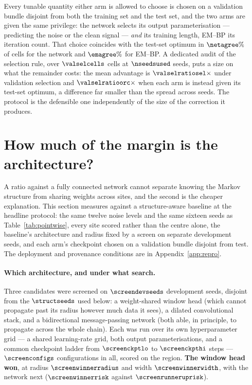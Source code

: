 Every tunable quantity either arm is allowed to choose is chosen on a
validation bundle disjoint from both the training set and the test set, and the
two arms are given the same privilege: the network selects its output
parameterisation --- predicting the noise or the clean signal --- \emph{and} its
training length, EM--BP its iteration count. That choice coincides with the
test-set optimum in $\netagree\%$ of cells for the network and $\emagree\%$ for
EM--BP. A dedicated audit of the selection rule, over $\valselcells$ cells at
$\nseedsused$ seeds, puts a size on what the remainder costs: the mean advantage
is $\valselratiosel\times$ under validation selection and
$\valselratioorc\times$ when each arm is instead given its test-set optimum, a
difference far smaller than the spread across seeds. The protocol is the
defensible one independently of the size of the correction it produces.

\section{How much of the margin is the architecture?}\label{sec:em-architecture}

A ratio against a fully connected network cannot separate knowing the Markov
structure from sharing weights across sites, and the second is the cheaper
explanation. This section measures against a structure-aware baseline at the
headline protocol: the same twelve noise levels and the same sixteen seeds as
Table~\ref{tab:pointwise}, every site scored rather than the centre alone, the
baseline's architecture and radius fixed by a screen on separate development
seeds, and each arm's checkpoint chosen on a validation bundle disjoint from
test. The deployment and provenance conditions are in
Appendix~\ref{app:repro}.

\paragraph{Which architecture, and under what search.} Three candidates were
screened on $\screendevseeds$ development seeds, disjoint from the
$\structseeds$ used below: a weight-shared window head (which cannot propagate
past its radius however much data it sees), a dilated convolutional stack, and a
bidirectional message-passing network (both able, in principle, to propagate
across the whole chain). Each was run over its own hyperparameter grid --- a
shared learning-rate grid, both output parameterisations, and a common
checkpoint ladder from $\screenckptlo$ to $\screenckpthi$ steps ---
$\screenconfigs$ configurations in all, scored on the \screenregion{} region.
\textbf{The window head won}, at radius $\screenwinnerradius$ and width
$\screenwinnerwidth$, with the \screenrunnerup{} network next
($\screenwinnerrisk$ against $\screenrunneruprisk$).

